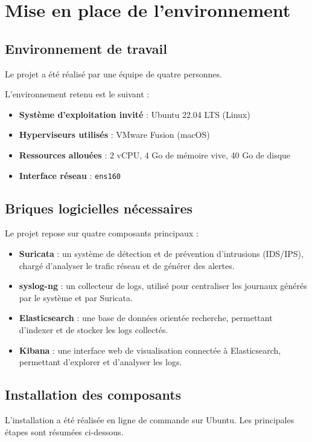 \chapter{Mise en place de l’environnement}
\label{chap:chap_1}


\section{Environnement de travail}
Le projet a été réalisé par une équipe de quatre personnes.

L’environnement retenu est le suivant :
\begin{itemize}
    \item \textbf{Système d’exploitation invité} : Ubuntu 22.04 LTS (Linux)
    \item \textbf{Hyperviseurs utilisés} : VMware Fusion (macOS)
    \item \textbf{Ressources allouées} : 2 vCPU, 4 Go de mémoire vive, 40 Go de disque
    \item \textbf{Interface réseau} : \texttt{ens160}
\end{itemize}

\section{Briques logicielles nécessaires}
Le projet repose sur quatre composants principaux :
\begin{itemize}
    \item \textbf{Suricata} : un système de détection et de prévention d’intrusions (IDS/IPS), chargé d’analyser le trafic réseau et de générer des alertes.
    \item \textbf{syslog-ng} : un collecteur de logs, utilisé pour centraliser les journaux générés par le système et par Suricata.
    \item \textbf{Elasticsearch} : une base de données orientée recherche, permettant d’indexer et de stocker les logs collectés.
    \item \textbf{Kibana} : une interface web de visualisation connectée à Elasticsearch, permettant d’explorer et d’analyser les logs.
\end{itemize}

\section{Installation des composants}
L’installation a été réalisée en ligne de commande sur Ubuntu. Les principales étapes sont résumées ci-dessous.

